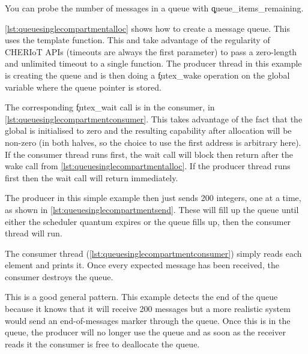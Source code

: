 You can probe the number of messages in a queue with \c{queue_items_remaining}.


\ref{lst:queuesinglecompartmentalloc} shows how to create a message queue.
This uses the  template function.
This and  take advantage of the regularity of CHERIoT APIs (timeouts are always the first parameter) to pass a zero-length and unlimited timeout to a single function.
The producer thread in this example is creating the queue and is then doing a \c{futex_wake} operation on the global variable where the queue pointer is stored.

\codelisting[filename=examples/producer_consumer/queue.cc,marker=allocate,label=lst:queuesinglecompartmentalloc,caption="Allocating a message queue for use in a single compartment"]{}

The corresponding \c{futex_wait} call is in the consumer, in \ref{lst:queuesinglecompartmentconsumer}.
This takes advantage of the fact that the global is initialised to zero and the resulting capability after allocation will be non-zero (in both halves, so the choice to use the first address is arbitrary here).
If the consumer thread runs first, the wait call will block then return after the wake call from \ref{lst:queuesinglecompartmentalloc}.
If the producer thread runs first then the wait call will return immediately.

The producer in this simple example then just sends 200 integers, one at a time, as shown in \ref{lst:queuesinglecompartmentsend}.
These will fill up the queue until either the scheduler quantum expires or the queue fills up, then the consumer thread will run.

\codelisting[filename=examples/producer_consumer/queue.cc,marker=queue_send,label=lst:queuesinglecompartmentsend,caption="Sending messages to a message queue."]{}

The consumer thread (\ref{lst:queuesinglecompartmentconsumer}) simply reads each element and prints it.
Once every expected message has been received, the consumer destroys the queue.

This is a good general pattern.
This example detects the end of the queue because it knows that it will receive 200 messages but a more realistic system would send an end-of-messages marker through the queue.
Once this is in the queue, the producer will no longer use the queue and as soon as the receiver reads it the consumer is free to deallocate the queue.

